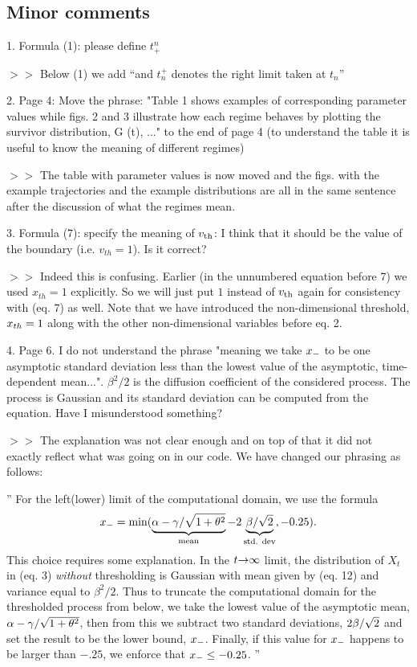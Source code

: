 \documentclass{article}
\begin{document}
\subsection{Minor comments}
\vskip 10pt 1. Formula (1): please define $t^n_+$

$>>$ Below (1) we add ``and $t_n^+$ denotes the right
limit taken at $t_n$''

\vskip 10pt 2. Page 4: Move the phrase: "Table 1 shows examples of corresponding
parameter values while figs. 2 and 3 illustrate how each regime behaves
by plotting the survivor distribution, G (t), ..." to the end of page 4 (to
understand the table it is useful to know the meaning of different regimes)

$>>$ The table with parameter values is now moved and the figs. with the example
trajectories and the example distributions are all in the same sentence after
the discussion of what the regimes mean.

\vskip 10pt 3. Formula (7): specify the meaning of ${ v_{\textrm{th} } }$: I think that it should be the
value of the boundary (i.e. $v_{th} = 1$). Is it correct?

$>>$ Indeed this is confusing. Earlier (in the unnumbered equation before 7) we
used $x_{th} = 1$ explicitly. So we will just put $1$ instead of ${ v_{\textrm{th} } }$ again for
consistency with (eq. 7) as well. Note that we have introduced the
non-dimensional threshold, ${ x_{th} } = 1$ along with the other non-dimensional variables before eq.
2.


\vskip 10pt 4. Page 6. I do not understand the phrase "meaning we take
${ x_{-} }$ to be
one asymptotic standard deviation less than the lowest value of the asymptotic,
time-dependent mean...". $\beta^2/2$ is the diffusion coefficient of the considered
process. The process is Gaussian and its standard deviation can be computed from the
equation. Have I misunderstood something?

$>>$ The explanation was not clear enough and on top of that it did
not exactly reflect what was going on in our code. We have changed our phrasing
as follows:

'' For the left(lower) limit of the computational domain, we use the formula $$ { x_{-} } =
\min(\underbrace{{\alpha} -{\gamma }/\sqrt{1+{\theta}^2}}_{\textrm{mean}} - 2 \underbrace{{\beta}/
\sqrt{2}}_{\textrm{std. dev}}, -0.25).$$ This choice requires some explanation.
In the $t{\rightarrow} \infty$ limit, the distribution of $X_t$ in
(eq. 3) {\sl without} thresholding is Gaussian
with mean given by (eq. 12) and variance equal to $\beta^2/2$. Thus to truncate
the computational domain for the thresholded process from below, we take the lowest value of
the asymptotic mean, $\alpha - \gamma / \sqrt{1 + {\theta}^2}$, then from
this we subtract two standard deviations, $2{\beta}/\sqrt{2}$ and set the result to be the lower
bound, ${ x_{-} }$. Finally, if this value for ${ x_{-} }$ happens to be larger than
$-.25$, we enforce that ${ x_{-} } \leq -0.25$. ''
\end{document}
